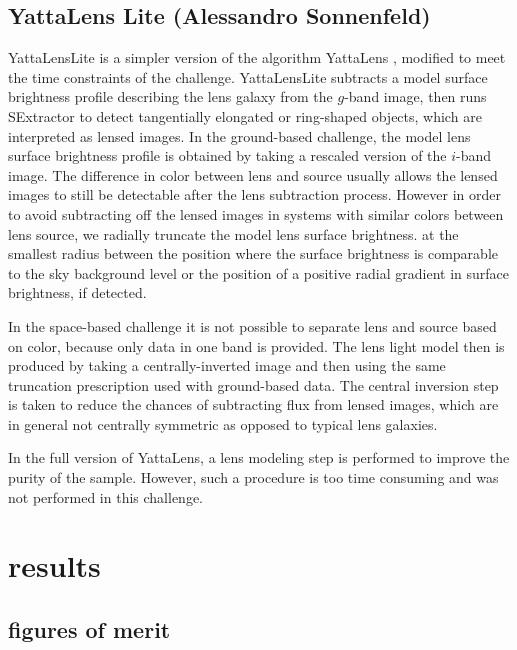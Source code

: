 \documentclass[useAMS,usenatbib]{mn2e}
\begin{document}
\subsection{YattaLens Lite (Alessandro Sonnenfeld)}
YattaLensLite is a simpler version of the algorithm YattaLens \citep{Sonnenfeld17}, modified to meet the time constraints of the challenge.
YattaLensLite subtracts a model surface brightness profile describing the lens galaxy from the $g$-band image, then runs SExtractor to detect tangentially elongated or ring-shaped objects, which are interpreted as lensed images.
In the ground-based challenge, the model lens surface brightness profile is obtained by taking a rescaled version of the $i$-band image.
The difference in color between lens and source usually allows the lensed images to still be detectable after the lens subtraction process.
However in order to avoid subtracting off the lensed images in systems with similar colors between lens source, we radially truncate the model lens surface brightness.
at the smallest radius between the position where the surface brightness is comparable to the sky background level or the position of a positive radial gradient in surface brightness, if detected.

In the space-based challenge it is not possible to separate lens and source based on color, because only data in one band is provided. The lens light model then is produced by taking a centrally-inverted image and then using the same truncation prescription used with ground-based data. The central inversion step is taken to reduce the chances of subtracting flux from lensed images, which are in general not centrally symmetric as opposed to typical lens galaxies.

In the full version of YattaLens, a lens modeling step is performed to improve the purity of the sample. However, such a procedure is too time consuming and was not performed in this challenge.

\section{results}

\subsection{figures of merit}
\end{document}
